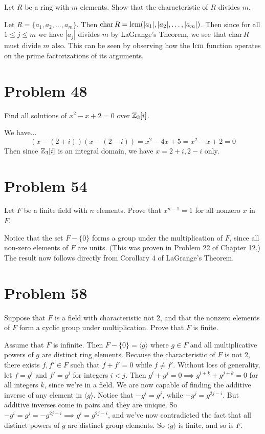 \documentclass{article}
\begin{document}
Let $R$ be a ring with $m$ elements.  Show that the characteristic of $R$ divides $m$.

Let $R=\{a_1,a_2,\dots,a_m\}$.  Then $\mbox{char}\,R=\mbox{lcm}(|a_1|,|a_2|,\dots,|a_m|)$.
Then since for all $1\leq j\leq m$ we have $|a_j|$ divides $m$ by LaGrange's Theorem,
we see that $\mbox{char}\,R$ must divide $m$ also.
This can be seen by observing how the $\mbox{lcm}$ function operates on the prime factorizations
of its arguments.

\section*{Problem 48}

Find all solutions of $x^2-x+2=0$ over $\mathbb{Z}_3[i]$.

We have...
\begin{equation*}
(x-(2+i))(x-(2-i)) = x^2-4x+5 = x^2-x+2 = 0
\end{equation*}
Then since $\mathbb{Z}_3[i]$ is an integral domain, we have
$x=2+i,2-i$ only.

\section*{Problem 54}

Let $F$ be a finite field with $n$ elements.  Prove that $x^{n-1}=1$ for all
nonzero $x$ in $F$.

Notice that the set $F-\{0\}$ forms a group under the multiplication of $F$,
since all non-zero elements of $F$ are units.  (This was proven in Problem 22
of Chapter 12.)  The result now follows directly from Corollary 4 of
LaGrange's Theorem.

\section*{Problem 58}

Suppose that $F$ is a field with characteristic not 2,
and that the nonzero elements of $F$ form a cyclic group under multiplication.
Prove that $F$ is finite.

Assume that $F$ is infinite.  Then $F-\{0\}=\langle g\rangle$ where
$g\in F$ and all multiplicative powers of $g$ are distinct ring elements.
Because the characteristic of $F$ is not 2, there exists $f,f'\in F$
such that $f+f'=0$ while $f\neq f'$.  Without loss of generality,
let $f=g^i$ and $f'=g^j$ for integers $i<j$.
Then $g^i+g^j=0\implies g^{i+k}+g^{j+k}=0$ for all integers $k$, since
we're in a field.  We are now capable of finding the additive inverse
of any element in $\langle g\rangle$.
Notice that $-g^i=g^j$, while $-g^j = g^{2j-i}$.  But additive inverses
come in pairs and they are unique.
So $-g^i = g^j = -g^{2j-i}\implies g^i=g^{2j-i}$, and we've now
contradicted the fact that all distinct powers of $g$ are distinct
group elements.  So $\langle g\rangle$ is finite, and so is $F$.
\end{document}
